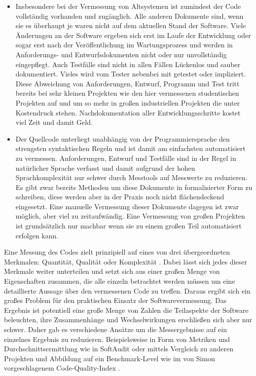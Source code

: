 \documentclass[gb,ngerman]{stthesis}
\begin{document}
  		\begin{itemize}
  		\item Insbesondere bei der Vermessung von Altsystemen ist zumindest der Code vollständig vorhanden und zugänglich. Alle anderen Dokumente sind, wenn sie es überhaupt je waren nicht auf dem aktuellen Stand der Software. Viele Änderungen an der Software ergeben sich erst im Laufe der Entwicklung oder sogar erst nach der Veröffentlichung im Wartungsprozess und werden in Anforderungs- und Entwurfsdokumenten nicht oder nur unvollständig eingepflegt. Auch Testfälle sind nicht in allen Fällen Lückenlos und sauber dokumentiert. Vieles wird vom Tester nebenbei mit getestet oder impliziert. Diese Abweichung von Anforderungen, Entwurf, Programm und Test tritt bereits bei sehr kleinen Projekten wie den hier vermessenen studentischen Projekten auf und um so mehr in großen industriellen Projekten die unter Kostendruck stehen. Nachdokumentation aller Entwicklungsschritte kostet viel Zeit und damit Geld. 
  		\item Der Quellcode unterliegt unabhängig von der Programmiersprache den strengsten syntaktischen Regeln und ist damit am einfachsten automatisiert zu vermessen. Anforderungen, Entwurf und Testfälle sind in der Regel in natürlicher Sprache verfasst und damit aufgrund der hohen Sprachkomplexität nur schwer durch Messtools auf Messwerte zu reduzieren. Es gibt zwar bereits Methoden um diese Dokumente in formalisierter Form zu schreiben, diese werden aber in der Praxis noch nicht flächendeckend eingesetzt. Eine manuelle Vermessung dieser Dokumente dagegen ist zwar möglich, aber viel zu zeitaufwändig. Eine Vermessung von großen Projekten ist grundsätzlich nur machbar wenn sie zu einem großen Teil automatisiert erfolgen kann. 
  		\end{itemize}
  		Eine Messung des Codes zielt prinzipiell auf eines von drei übergeordneten Merkmalen: Quantität, Qualität oder Komplexität \cite{SoftwareInZahlen}. Dabei lässt sich jedes dieser Merkmale weiter unterteilen und setzt sich aus einer großen Menge von Eigenschaften zusammen, die alle einzeln betrachtet werden müssen um eine detaillierte Aussage über den vermessenen Code zu treffen. Daraus ergibt sich ein großes Problem für den praktischen Einsatz der Softwarevermessung. Das Ergebnis ist potentiell eine große Menge von Zahlen die Teilaspekte der Software beleuchten, ihre Zusammenhänge und Wechselwirkungen erschließen sich aber nur schwer. Daher gab es verschiedene Ansätze um die Messergebnisse auf ein einzelnes Ergebnis zu reduzieren. Beispielsweise in Form von Metriken und Durchschnittsermittlung wie in SoftAudit oder mittels Vergleich zu anderen Projekten und Abbildung auf ein Benchmark-Level wie im von Simon vorgeschlagenem Code-Quality-Index \cite{CodeQualityManagement}.
\end{document}
